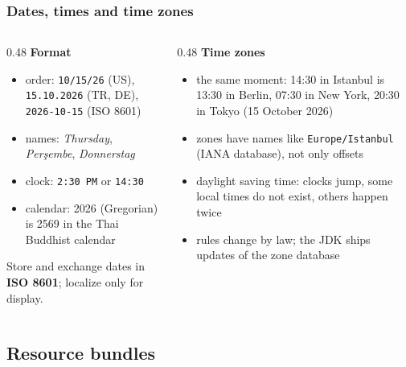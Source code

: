 \documentclass[aspectratio=169,10pt,compress]{beamer}
\begin{document}
\begin{frame}[t,fragile] \frametitle{Dates, times and time zones}
  \begin{columns}[T]
    \begin{column}{0.48\textwidth}
      \textbf{Format}
      \begin{itemize}\small
        \item order: \texttt{10/15/26} (US), \texttt{15.10.2026} (TR, DE), \texttt{2026-10-15} (ISO 8601)
        \item names: \emph{Thursday}, \emph{Perşembe}, \emph{Donnerstag}
        \item clock: \texttt{2:30 PM} or \texttt{14:30}
        \item calendar: 2026 (Gregorian) is 2569 in the Thai Buddhist calendar
      \end{itemize}
      \small Store and exchange dates in \textbf{ISO 8601}; localize only for display.
    \end{column}
    \begin{column}{0.48\textwidth}
      \textbf{Time zones}
      \begin{itemize}\small
        \item the same moment: 14:30 in Istanbul is 13:30 in Berlin, 07:30 in New York, 20:30 in Tokyo
          (15 October 2026)
        \item zones have names like \texttt{Europe/Istanbul} (IANA database), not only offsets
        \item daylight saving time: clocks jump, some local times do not exist, others happen twice
        \item rules change by law; the JDK ships updates of the zone database
      \end{itemize}
    \end{column}
  \end{columns}
\end{frame}


\subsection[Bundles]{Resource bundles}
\end{document}
